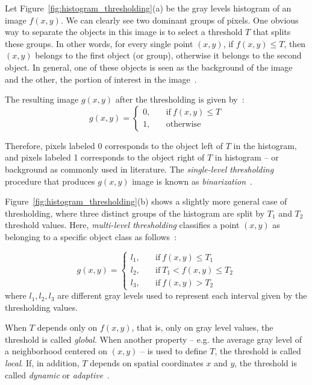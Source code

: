 Let Figure~\ref{fig:histogram_thresholding}(a) be the gray levels histogram of an image $f(x, y)$. We can clearly see two dominant groups of pixels. One obvious way to separate the objects in this image is to select a threshold $T$ that splits these groups. In other words, for every single point $(x, y)$, if $f(x, y) \leq T$, then $(x, y)$ belongs to the first object (or group), otherwise it belongs to the second object. In general, one of these objects is seen as the background of the image and the other, the portion of interest in the image~\citep{gonzalez:02}.


The resulting image $g(x, y)$ after the thresholding is given by~\citep{gonzalez:02}:
\begin{equation}
g(x, y) =   \begin{cases}
                0, \quad &\text{if}\ f(x, y) \leq T\\[0.7em]
                1, \quad &\text{otherwise}
            \end{cases}
\end{equation}

Therefore, pixels labeled 0 corresponds to the object left of $T$ in the histogram, and pixels labeled 1 corresponds to the object right of $T$ in histogram -- or background as commonly used in literature. The \emph{single-level thresholding} procedure that produces $g(x, y)$ image is known as \emph{binarization}~\citep{gonzalez:02}.

Figure~\ref{fig:histogram_thresholding}(b) shows a slightly more general case of thresholding, where three distinct groups of the histogram are split by $T_1$ and $T_2$ threshold values. Here, \emph{multi-level thresholding} classifies a point $(x, y)$ as belonging to a specific object class as follows~\citep{gonzalez:02}:

\begin{equation}
g(x, y) =   \begin{cases}
                l_1, \quad &\text{if}\ f(x, y) \leq T_1\\[0.7em]
                l_2, \quad &\text{if}\ T_1 < f(x, y) \leq T_2\\[0.7em]
                l_3, \quad &\text{if}\ f(x, y) > T_2
            \end{cases}
\end{equation}
where $l_1, l_2, l_3$ are different gray levels used to represent each interval given by the thresholding values.

When $T$ depends only on $f(x, y)$, that is, only on gray level values, the threshold is called \emph{global}. When another property -- e.g. the average gray level of a neighborhood centered on $(x, y)$ -- is used to define $T$, the threshold is called \emph{local}. If, in addition, $T$ depends on spatial coordinates $x$ and $y$, the threshold is called \emph{dynamic} or \emph{adaptive}~\citep{gonzalez:02}. 


